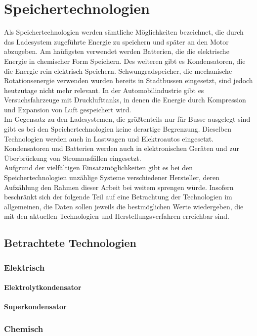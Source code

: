 \documentclass{scrreprt}
\begin{document}
\chapter{Speichertechnologien}
Als Speichertechnologien werden sämtliche Möglichkeiten bezeichnet, die durch das Ladesystem zugeführte Energie zu speichern und später an den Motor abzugeben. Am haüfigsten verwendet werden Batterien, die die elektrische Energie in chemischer Form Speichern. Des weiteren gibt es Kondensatoren, die die Energie rein elektrisch Speichern. Schwungradspeicher, die mechanische Rotationsenergie verwenden wurden bereits in Stadtbussen eingesetzt, sind jedoch heutzutage nicht mehr relevant. In der Automobilindustrie gibt es Versuchsfahrzeuge mit Drucklufttanks, in denen die Energie durch Kompression und Expansion von Luft gespeichert wird.\\
Im Gegensatz zu den Ladesystemen, die größtenteils nur für Busse ausgelegt sind gibt es bei den Speichertechnologien keine derartige Begrenzung. Dieselben Technologien werden auch in Lastwagen und Elektroautos eingesetzt. Kondensatoren und Batterien werden auch in elektronischen Geräten und zur Überbrückung von Stromausfällen eingesetzt.\\
Aufgrund der vielfältigen Einsatzmöglichkeiten gibt es bei den Speichertechnologien unzählige Systeme verschiedener Hersteller, deren Aufzählung den Rahmen dieser Arbeit bei weitem sprengen würde. Insofern beschränkt sich der folgende Teil auf eine Betrachtung der Technologien im allgemeinen, die Daten sollen jeweils die bestmöglichen Werte wiedergeben, die mit den aktuellen Technologien und Herstellungsverfahren erreichbar sind.

\section{Betrachtete Technologien}
\subsection{Elektrisch}
\subsubsection{Elektrolytkondensator}
\subsubsection{Superkondensator}

\subsection{Chemisch}
\end{document}
